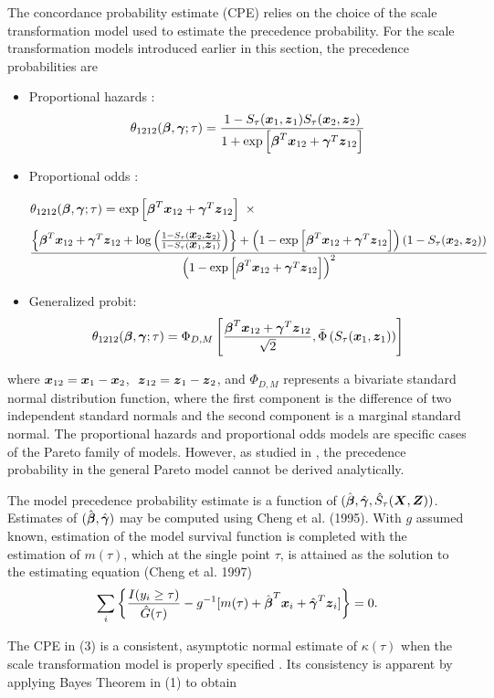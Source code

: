 \documentclass[12pt]{article}
\newcommand{\bmx}{\mbox{\boldmath $x$}}
\newcommand{\bmX}{\mbox{\boldmath $X$}}
\newcommand{\bg}{\mbox{\boldmath $\gamma$}}
\newcommand{\bb}{\mbox{\boldmath $\beta$}}
\newcommand{\bmZ}{\mbox{\boldmath $Z$}}
\newcommand{\bmz}{\mbox{\boldmath $z$}}
\begin{document}
The concordance probability estimate (CPE) relies on the choice of the scale transformation model used to estimate the precedence probability. For the scale transformation models introduced earlier in this section, the precedence probabilities are
\begin{itemize}

\item Proportional hazards : 
\[\theta_{1212}(\bb, \bg; \tau) = \frac{1-S_{\tau}(\bmx_1,\bmz_1)S_{\tau}(\bmx_2,\bmz_2)}{1 +\exp\left[\bb^T\bmx_{12}+\bg^T\bmz_{12}\right]}  \]
\item Proportional odds :     
\small

\noindent  $\theta_{1212}(\bb, \bg; \tau) = \exp\left[\bb^T\bmx_{12}+\bg^T\bmz_{12}\right] \ \times $
\[ \frac{\left\{\bb^T\bmx_{12}+\bg^T\bmz_{12}+\log\left(\frac{1-S_{\tau}(\bmx_2,\bmz_2)}{1-S_{\tau}(\bmx_1,\bmz_1)}\right)\right\} +\left(1-\exp\left[\bb^T\bmx_{12}+\bg^T\bmz_{12}\right]\right) \left(1-S_{\tau}(\bmx_2,\bmz_2)\right)}{ \left(1 -\exp\left[\bb^T\bmx_{12}+\bg^T\bmz_{12}\right]\right)^2} \]

\normalsize
\item Generalized probit:
\[ \theta_{1212}(\bb, \bg; \tau) = \Phi_{D,M}\left[\frac{\bb^T\bmx_{12}+\bg^T\bmz_{12}}{\sqrt{2}}, \bar{\Phi}\left(S_{\tau}(\bmx_1,\bmz_1)\right)\right] \]
\end{itemize}
where $\bmx_{12} = \bmx_1 - \bmx_2$,  $\ \bmz_{12} = \bmz_1 - \bmz_2$, and $\Phi_{D,M}$ represents a bivariate standard normal distribution function, where the first component is the difference of two independent standard normals and the second component is a marginal standard normal. The proportional hazards and proportional odds models are specific cases of the Pareto family of models. However, as studied in \cite{brentnall2018use}, the precedence probability in the general Pareto model cannot be derived analytically.

The model precedence probability estimate is a function of $(\hat{\bb}, \hat{\bg}, \hat{S}_{\tau}(\bmX, \bmZ))$. Estimates of $(\hat{\bb}, \hat{\bg})$ may be computed using Cheng et al. (1995). With $g$ assumed known, estimation of the model survival function is completed with the estimation of $m(\tau)$, which at the single point $\tau$, is attained as the solution to the estimating equation (Cheng et al. 1997)
\[ \sum_i \left\{ \frac{I(y_i \ge \tau)}{\hat{G}(\tau)} - g^{-1}[m(\tau) + \hat{\bb}^T\bmx_i +\hat{\bg}^T\bmz_i] \right\} = 0  .\]

\bigskip
The CPE in (3) is a consistent, asymptotic normal estimate of $\kappa(\tau)$ when the scale transformation model is properly specified \citep{Devlin2021}.  Its consistency is apparent by applying Bayes Theorem in (1) to obtain
\end{document}

